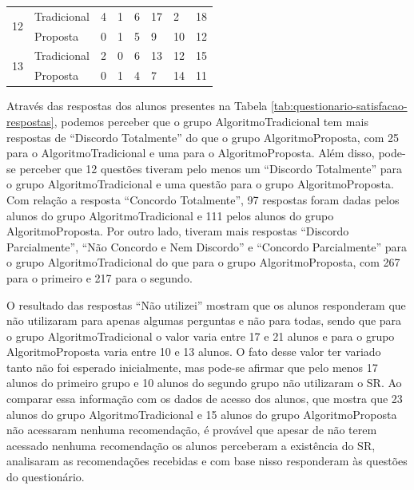 \begin{table}[h]
\begin{tabular}{|p{1.5cm}|p{1.8cm}|p{2.2cm}|p{0.6cm}|p{0.6cm}|p{0.6cm}|p{2.3cm}|p{2cm}|}
\hline
\multirow{2}{*}{12}         & Tradicional & 4                   & 1                     & 6                         & 17                    & 2                   & 18           \\
                            & Proposta    & 0                   & 1                     & 5                         & 9                     & 10                  & 12           \\
\hline
\multirow{2}{*}{13}         & Tradicional & 2                   & 0                     & 6                         & 13                    & 12                  & 15           \\
                            & Proposta    & 0                   & 1                     & 4                         & 7                     & 14                  & 11           \\
\hline
\end{tabular}
\end{table}

Através das respostas dos alunos presentes na Tabela \ref{tab:questionario-satisfacao-respostas}, podemos perceber que
o grupo AlgoritmoTradicional tem mais respostas de ``Discordo Totalmente'' do
que o grupo AlgoritmoProposta, com 25 para o AlgoritmoTradicional e uma para o AlgoritmoProposta.
Além disso, pode-se perceber que 12 questões tiveram pelo menos um ``Discordo Totalmente'' para o grupo AlgoritmoTradicional
e uma questão para o grupo AlgoritmoProposta. Com relação a resposta ``Concordo Totalmente'',
97 respostas foram dadas pelos alunos do grupo AlgoritmoTradicional e 111
pelos alunos do grupo AlgoritmoProposta. Por outro lado, tiveram mais respostas ``Discordo Parcialmente'',
``Não Concordo e Nem Discordo'' e ``Concordo Parcialmente'' para o grupo AlgoritmoTradicional do que para o grupo
AlgoritmoProposta, com 267 para o primeiro e 217 para o segundo.

O resultado das respostas ``Não utilizei'' mostram que os alunos responderam que não utilizaram para apenas algumas
perguntas e não para todas, sendo que para o grupo AlgoritmoTradicional o valor varia entre 17 e 21 alunos e para o grupo
AlgoritmoProposta varia entre 10 e 13 alunos. O fato desse valor ter variado tanto não foi esperado inicialmente, mas pode-se
afirmar que pelo menos 17 alunos do primeiro grupo e 10 alunos do segundo grupo não utilizaram o SR. Ao comparar essa
informação com os dados de acesso dos alunos, que mostra que 23 alunos do grupo AlgoritmoTradicional e 15 alunos do
grupo AlgoritmoProposta não acessaram nenhuma recomendação, é provável que apesar de não terem acessado nenhuma recomendação os
alunos perceberam a existência do SR, analisaram as recomendações recebidas e com base nisso responderam às questões do
questionário.

